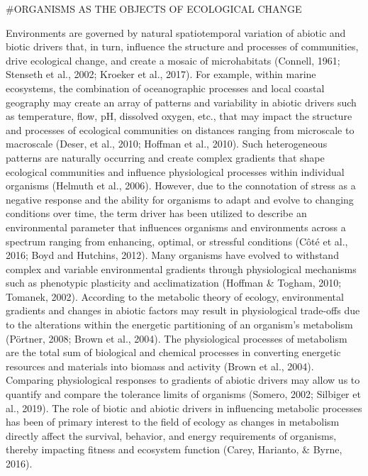 \documentclass[
  11pt,
]{article}
\begin{document}
\begin{centering}
#ORGANISMS AS THE OBJECTS OF ECOLOGICAL CHANGE
\end{centering}

Environments are governed by natural spatiotemporal variation of abiotic
and biotic drivers that, in turn, influence the structure and processes
of communities, drive ecological change, and create a mosaic of
microhabitats (Connell, 1961; Stenseth et al., 2002; Kroeker et al.,
2017). For example, within marine ecosystems, the combination of
oceanographic processes and local coastal geography may create an array
of patterns and variability in abiotic drivers such as temperature,
flow, pH, dissolved oxygen, etc., that may impact the structure and
processes of ecological communities on distances ranging from microscale
to macroscale (Deser, et al., 2010; Hoffman et al., 2010). Such
heterogeneous patterns are naturally occurring and create complex
gradients that shape ecological communities and influence physiological
processes within individual organisms (Helmuth et al., 2006). However,
due to the connotation of stress as a negative response and the ability
for organisms to adapt and evolve to changing conditions over time, the
term driver has been utilized to describe an environmental parameter
that influences organisms and environments across a spectrum ranging
from enhancing, optimal, or stressful conditions (Côté et al., 2016;
Boyd and Hutchins, 2012). Many organisms have evolved to withstand
complex and variable environmental gradients through physiological
mechanisms such as phenotypic plasticity and acclimatization (Hoffman \&
Togham, 2010; Tomanek, 2002). According to the metabolic theory of
ecology, environmental gradients and changes in abiotic factors may
result in physiological trade-offs due to the alterations within the
energetic partitioning of an organism's metabolism (Pörtner, 2008; Brown
et al., 2004). The physiological processes of metabolism are the total
sum of biological and chemical processes in converting energetic
resources and materials into biomass and activity (Brown et al., 2004).
Comparing physiological responses to gradients of abiotic drivers may
allow us to quantify and compare the tolerance limits of organisms
(Somero, 2002; Silbiger et al., 2019). The role of biotic and abiotic
drivers in influencing metabolic processes has been of primary interest
to the field of ecology as changes in metabolism directly affect the
survival, behavior, and energy requirements of organisms, thereby
impacting fitness and ecosystem function (Carey, Harianto, \& Byrne,
2016).
\end{document}
